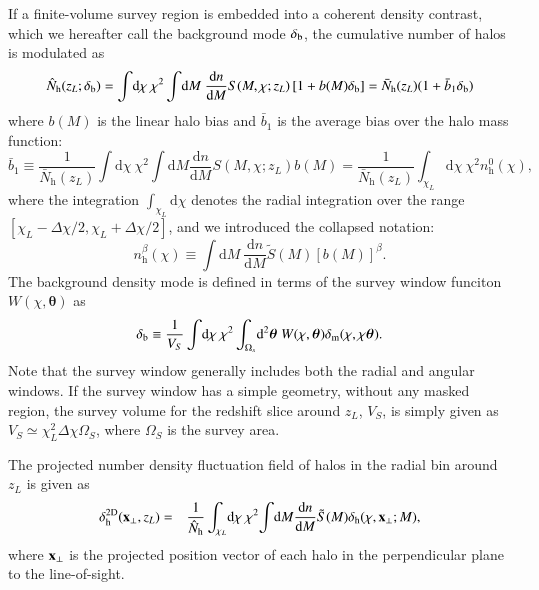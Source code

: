 \documentclass[onecolumn,notitlepage,showpacs,amsmath,amssymb,prd,floatfix]{revtex4-1}
\newcommand{\bx}{{\bf x}}
\newcommand{\bk}{{\bf k}}
\newcommand{\btheta}{{\bm{\theta}}}
\newcommand{\dr}{\mathrm{d}}
\newcommand{\deltam}{\delta_{\mathrm{m}}}
\newcommand{\deltah}{\delta_{\mathrm{h}}}
\newcommand{\bh}{\mathrm{h}}
\newcommand{\bnh}{\frac{\dr n}{\dr M}}
\newcommand{\br}{{\rm b}}
\begin{document}
If a finite-volume survey region is embedded into a coherent density
contrast, which we hereafter call the background mode $\delta_\br$, the
cumulative number of halos is modulated as
%
\begin{equation}
 \hat{N}_\bh(z_L;\delta_\br)=\int\!\dr\chi~\chi^2\int\!\dr M~\frac{\dr n}{\dr M}S(M,\chi;z_L)
  \left[1+b(M)\delta_\br\right]=\bar{N}_{\bh}(z_L)(1+\bar{b}_1\delta_\br)
\end{equation}
%
where $b(M)$ is the linear halo bias and $\bar{b}_1$ is the average
bias over the halo mass function:
%
\begin{equation}
 \bar{b}_1\equiv
  \frac{1}{\bar{N}_\bh(z_L)}\int\!\dr\chi~\chi^2\int\!\dr M\frac{\dr n}{\dr M}S(M,\chi;z_L)b(M)
  =\frac{1}{\bar{N}_\bh(z_L)}\int_{\chi_L}\!\dr\chi~\chi^2{n}_\bh^0(\chi),
\end{equation}
%
where the integration $\int_{\chi_L}\!\dr\chi$ denotes the radial
integration over the range $[\chi_L-\Delta\chi/2,\chi_L+\Delta\chi/2]$,
and we introduced the collapsed notation:
%
\begin{equation}
 {n}_{\bh}^\beta(\chi)\equiv \int\!\dr M~\frac{\dr n}{\dr M}\tilde{S}(M)\left[b(M)\right]^\beta.
  \label{eq:def_S}
\end{equation}
%
The background density mode is defined in terms of the survey window
funciton $W(\chi,\btheta)$ as
%
\begin{equation}
\delta_\br\equiv
 \frac{1}{V_S}\int\!\dr\chi~\chi^2\int_{\Omega_s}\!\dr^2\btheta~ W(\chi,\btheta)
 \deltam(\chi,\chi\btheta).
\end{equation}
%
Note that the survey window generally includes both the radial and
angular windows.  If the survey window has a simple geometry, without
any masked region, the survey volume for the redshift slice around
$z_L$, $V_S$, is simply given as $V_S\simeq \chi^2_L\Delta\chi\Omega_S$, where
$\Omega_S$ is the survey area.

The projected number density fluctuation field of halos in the radial
bin around $z_L$ is given as
%
\begin{eqnarray}
 \delta^{\rm
  2D}_{\mathrm{h}}(\bx_\perp,z_L)&=&\frac{1}{\hat{N}_{\mathrm{h}}}\int_{\chi_L}\!\dr\chi~
  \chi^2
  \!\int\!\dr M\frac{\dr n}{\dr M}\tilde{S}(M)\deltah(\chi,\bx_\perp;
  M),
\end{eqnarray}
%
where $\bx_\perp$ is the projected position vector of each halo in the
perpendicular plane to the line-of-sight.
\end{document}
